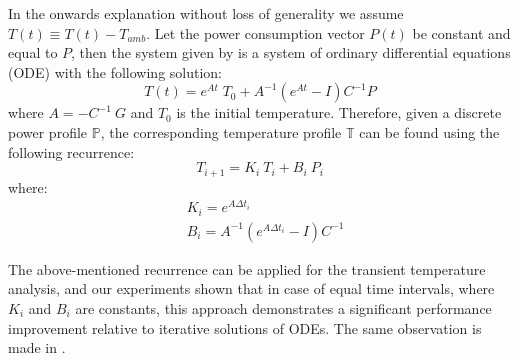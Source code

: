 In the onwards explanation without loss of generality we assume $T(t) \equiv T(t) - T_{amb}$. Let the power consumption vector $P(t)$ be constant and equal to $P$, then the system given by  is a system of ordinary differential equations (ODE) with the following solution:
\begin{equation} \label{eq:solution}
  T(t) = e^{A t} \; T_0 + A^{-1}(e^{A t} - I)C^{-1} P
\end{equation}
where $A = -C^{-1} \: G$ and $T_0$ is the initial temperature. Therefore, given a discrete power profile $\mathbb{P}$, the corresponding temperature profile $\mathbb{T}$ can be found using the following recurrence:
\begin{equation} \label{eq:recurrent-system}
  T_{i+1} = K_i \: T_i + B_i \: P_i
\end{equation}
where:
\begin{align*}
  & K_i = e^{A \Delta t_i} \\
  & B_i = A^{-1}(e^{A \Delta t_i} - I)C^{-1}
\end{align*}

The above-mentioned recurrence can be applied for the transient temperature analysis, and our experiments shown that in case of equal time intervals, where $K_i$ and $B_i$ are constants, this approach demonstrates a significant performance improvement relative to iterative solutions of ODEs. The same observation is made in \cite{thiele2011}.

